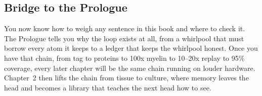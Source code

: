 \subsection*{Bridge to the Prologue}

You now know how to weigh any sentence in this book and where to check it. The Prologue tells you why the loop exists at all, from a whirlpool that must borrow every atom it keeps to a ledger that keeps the whirlpool honest. Once you have that chain, from tag to proteins to 100x myelin to 10--20x replay to 95\% coverage, every later chapter will be the same chain running on louder hardware. Chapter~2 then lifts the chain from tissue to culture, where memory leaves the head and becomes a library that teaches the next head how to see.
